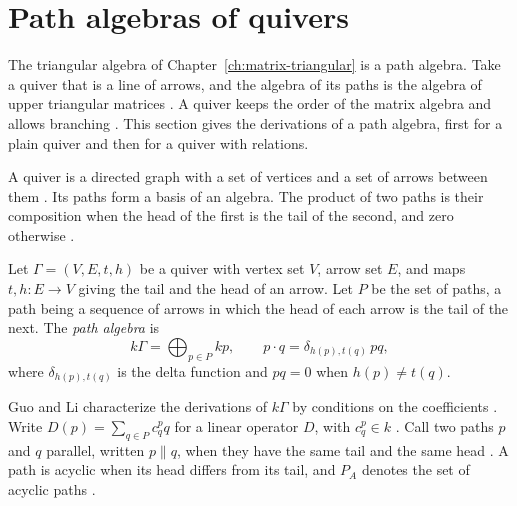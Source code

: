 \section{Path algebras of quivers}\label{sec:path-incidence:path}

The triangular algebra of Chapter~\ref{ch:matrix-triangular} is a path algebra.
Take a quiver that is a line of arrows, and the algebra of its paths is the algebra
of upper triangular matrices \cite[Example~2.1, p.~82]{LiWei2018}. A quiver keeps
the order of the matrix algebra and allows branching \cite[p.~81]{LiWei2018}. This
section gives the
derivations of a path algebra, first for a plain quiver and then for a quiver with
relations.

A quiver is a directed graph with a set of vertices and a set of arrows between them
\cite[p.~547]{GuoLi2014}. Its paths form a basis of an algebra. The product of two
paths is their composition when the head of the first is the tail of the second, and
zero otherwise \cite[p.~547]{GuoLi2014}.

\begin{definition}\label{def:path:algebra}
Let $\Gamma=(V,E,t,h)$ be a quiver with vertex set $V$, arrow set $E$, and maps
$t,h\colon E\to V$ giving the tail and the head of an arrow. Let $P$ be the set of
paths, a path being a sequence of arrows in which the head of each arrow is the tail
of the next. The \emph{path algebra} is
\begin{equation*}
k\Gamma=\bigoplus_{p\in P}kp,\qquad
p\cdot q=\delta_{h(p),t(q)}\,pq,
\end{equation*}
where $\delta_{h(p),t(q)}$ is the delta function and $pq=0$ when $h(p)\neq t(q)$.
\end{definition}

Guo and Li characterize the derivations of $k\Gamma$ by conditions on the
coefficients \cite[p.~548]{GuoLi2014}. Write $D(p)=\sum_{q\in P}c^{p}_{q}q$ for a
linear operator $D$, with $c^{p}_{q}\in k$ \cite[p.~548]{GuoLi2014}. Call two paths
$p$ and $q$ parallel, written $p\parallel q$, when they have the same tail and the
same head \cite[p.~548]{GuoLi2014}. A path is acyclic when its head differs from its
tail, and $P_{A}$ denotes the set of acyclic paths \cite[p.~548]{GuoLi2014}.

